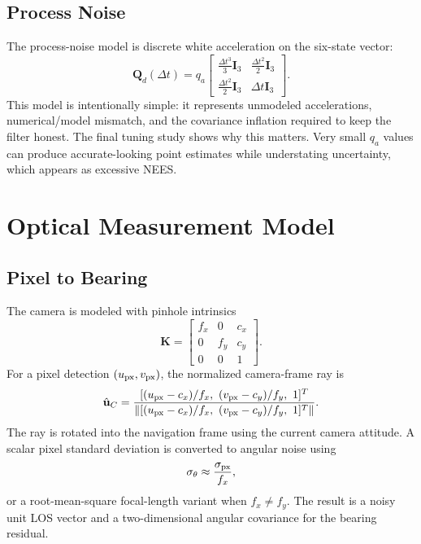 \documentclass[10pt,twocolumn]{article}
\newcommand{\vect}[1]{\mathbf{#1}}
\newcommand{\mat}[1]{\mathbf{#1}}
\newcommand{\unit}[1]{\hat{\mathbf{#1}}}
\begin{document}
\subsection{Process Noise}
The process-noise model is discrete white acceleration on the six-state vector:
\begin{equation}
\vect{Q}_d(\Delta t)=q_a
\begin{bmatrix}
\frac{\Delta t^3}{3}\mat{I}_3 & \frac{\Delta t^2}{2}\mat{I}_3\\
\frac{\Delta t^2}{2}\mat{I}_3 & \Delta t\mat{I}_3
\end{bmatrix}.
\label{eq:q}
\end{equation}
This model is intentionally simple: it represents unmodeled accelerations, numerical/model mismatch, and the covariance inflation required to keep the filter honest.  The final tuning study shows why this matters.  Very small $q_a$ values can produce accurate-looking point estimates while understating uncertainty, which appears as excessive NEES.

\section{Optical Measurement Model}
\subsection{Pixel to Bearing}
The camera is modeled with pinhole intrinsics
\[
\mat{K} =
\begin{bmatrix}
f_x & 0 & c_x\\
0 & f_y & c_y\\
0 & 0 & 1
\end{bmatrix}.
\]
For a pixel detection $(u_{\rm px},v_{\rm px})$, the normalized camera-frame ray is
\begin{equation}
\unit{u}_{C}=
\frac{[(u_{\rm px}-c_x)/f_x,\ (v_{\rm px}-c_y)/f_y,\ 1]^T}
{\left\|[(u_{\rm px}-c_x)/f_x,\ (v_{\rm px}-c_y)/f_y,\ 1]^T\right\|}.
\end{equation}
The ray is rotated into the navigation frame using the current camera attitude.  A scalar pixel standard deviation is converted to angular noise using
\begin{equation}
\sigma_\theta \approx \frac{\sigma_{\rm px}}{f_x},
\end{equation}
or a root-mean-square focal-length variant when $f_x\neq f_y$.  The result is a noisy unit LOS vector and a two-dimensional angular covariance for the bearing residual.
\end{document}
